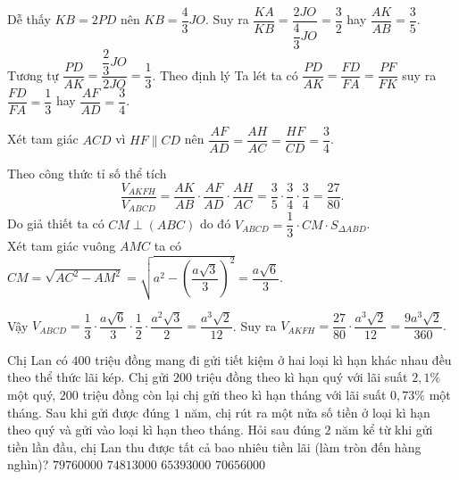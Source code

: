 \begin{ex}
{	 Dễ thấy $KB = 2PD$ nên $KB = \dfrac{4}{3}JO$. Suy ra $\dfrac{KA}{KB} = \dfrac{2JO}{\dfrac{4}{3}JO} =  \dfrac{3}{2}$ hay $\dfrac{AK}{AB} = \dfrac{3}{5}$.\\ 
	 Tương tự $\dfrac{PD}{AK} = \dfrac{\dfrac{2}{3}JO}{2JO} = \dfrac{1}{3}$. Theo định lý Ta lét ta có $\dfrac{PD}{AK} = \dfrac{FD}{FA} = \dfrac{PF}{FK}$ suy ra $\dfrac{FD}{FA} = \dfrac{1}{3}$ hay $\dfrac{AF}{AD} = \dfrac{3}{4}$.
	 
	 Xét tam giác $ACD$ vì $HF\parallel CD$ nên
	 $\dfrac{AF}{AD} = \dfrac{AH}{AC} = \dfrac{HF}{CD} = \dfrac{3}{4}$.
	 
	 Theo công thức tỉ số thể tích 
	 $$\dfrac{V_{AKFH}}{V_{ABCD}} = \dfrac{AK}{AB}\cdot \dfrac{AF}{AD}\cdot \dfrac{AH}{AC} = \dfrac{3}{5}\cdot \dfrac{3}{4}\cdot\dfrac{3}{4} = \dfrac{27}{80}.$$ 	
	Do giả thiết ta có $CM\perp \left(ABC\right)$ do đó $V_{ABCD} = \dfrac{1}{3}\cdot CM\cdot S_{\Delta ABD}$.\\
	Xét tam giác vuông $AMC$ ta có $CM = \sqrt{AC^2 - AM^2} = \sqrt{a^2 - \left(\dfrac{a\sqrt{3}}{3}\right)^2} = \dfrac{a\sqrt{6}}{3}$.
	
	Vậy $V_{ABCD} = \dfrac{1}{3}\cdot \dfrac{a\sqrt{6}}{3}\cdot \dfrac{1}{2}\cdot \dfrac{a^2\sqrt{3}}{2} = \dfrac{a^3\sqrt{2}}{12}$. Suy ra $V_{AKFH} = \dfrac{27}{80}\cdot \dfrac{a^3\sqrt{2}}{12} = \dfrac{9a^3\sqrt{2}}{360}.$
	
	
		
	}
\end{ex}

\begin{ex}%
	Chị Lan có $400$ triệu đồng mang đi gửi tiết kiệm ở hai loại kì hạn khác nhau đều theo thể thức lãi kép. Chị gửi $200$ triệu đồng theo kì hạn quý với lãi suất $2{,}1\%$ một quý, $200$ triệu đồng còn lại chị gửi theo kì hạn tháng với lãi suất $0{,}73\%$ một tháng. Sau khi gửi được đúng $1$ năm, chị rút ra một nửa số tiền ở loại kì hạn theo quý và gửi vào loại kì hạn theo tháng. Hỏi sau đúng $2$ năm kể từ khi gửi  tiền lần đầu, chị Lan thu được tất cả bao nhiêu tiền lãi (làm tròn đến hàng nghìn)?  
	\choice
	{$79760000$}
	{\True $74813000$}
	{$65393000$}
	{$70656000$}
\end{ex}

